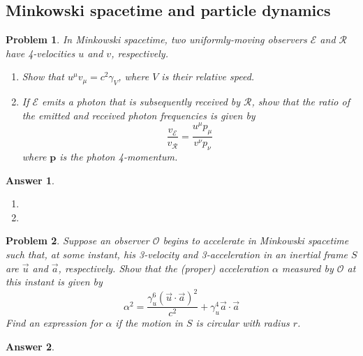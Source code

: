 \documentclass[a4paper]{article}
\newtheorem{ans}{Answer}[subsection]
\theoremstyle{new}
\newtheorem{qns}{Problem}[section]
\begin{document}
\newpage
\subsection*{Minkowski spacetime and particle dynamics}
\begin{qns}
In Minkowski spacetime, two uniformly-moving observers $\mathcal{E}$ and $\mathcal{R}$ have 4-velocities $u$ and $v$, respectively.
\begin{enumerate}[label=(\alph*)]
\item  Show that $u^\mu v_\mu=c^2\gamma_V$, where $V$ is their relative speed.
\item  If $\mathcal{E}$ emits a photon that is subsequently received by $\mathcal{R}$, show that the ratio of the emitted and received photon frequencies is given by
$$\frac{v_{\mathcal{E}}}{v_{\mathcal{R}}}=\frac{u^\mu p_\mu}{v^\nu p_\nu}$$
where $\mathbf{p}$ is the photon 4-momentum.
\end{enumerate}
\end{qns}
\begin{ans}\leavevmode
\begin{enumerate}[label=(\alph*)]
\item

\item 
\end{enumerate}
\end{ans}
\begin{qns}
Suppose an observer $\mathcal{O}$ begins to accelerate in Minkowski spacetime such that, at some instant, his 3-velocity and 3-acceleration in an inertial frame $S$ are $\vec{u}$ and $\vec{a}$, respectively. Show that the (proper) acceleration $\alpha$ measured by $\mathcal{O}$ at this instant is given by
$$\alpha^2=\frac{\gamma_u^6(\vec{u}\cdot\vec{a})^2}{c^2}+\gamma_u^4\vec{a}\cdot\vec{a}$$
Find an expression for $\alpha$ if the motion in $S$ is circular with radius $r$. 
\end{qns}
\begin{ans}

\end{ans}
\newpage
\end{document}
